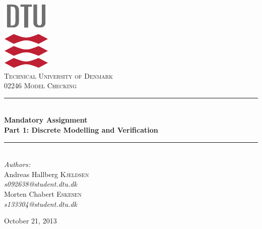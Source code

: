 \documentclass[12pt]{report}
\newcommand{\HRule}{\rule{\linewidth}{0.5mm}}
\begin{document}
\begin{titlepage}
\begin{center}

\includegraphics[scale=2.0]{../GFX/dtu_logo.pdf}\\[1cm]

\textsc{\LARGE Technical University of Denmark}\\[1.5cm]

\textsc{\Large 02246 Model Checking}\\[0.5cm]


\HRule \\[0.4cm]
{\huge \bfseries Mandatory Assignment\\Part 1: Discrete Modelling and Verification}\\[0.1cm]
\HRule \\[1.5cm]

\large
\emph{Authors:}
\\[10pt]
Andreas Hallberg \textsc{Kjeldsen}\\
\emph{s092638@student.dtu.dk}
\\[10pt]
Morten Chabert \textsc{Eskesen}\\
\emph{s133304@student.dtu.dk}

\vfill

{\large October 21, 2013}

\end{center}
\end{titlepage}

\end{document}
